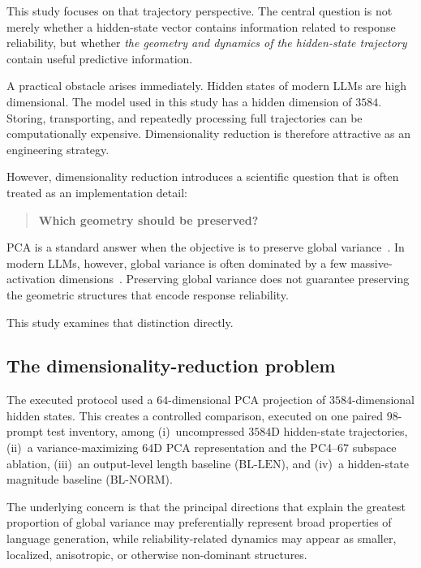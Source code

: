 \documentclass{article}
\newcommand{\bllen}{\mathrm{BL\text{-}LEN}}
\newcommand{\blnorm}{\mathrm{BL\text{-}NORM}}
\begin{document}
This study focuses on that trajectory perspective. The central question is not merely whether a hidden-state vector contains information related to response reliability, but whether \emph{the geometry and dynamics of the hidden-state trajectory} contain useful predictive information.

A practical obstacle arises immediately. Hidden states of modern {LLMs} are high dimensional. The model used in this study has a hidden dimension of $3584$. Storing, transporting, and repeatedly processing full trajectories can be computationally expensive. Dimensionality reduction is therefore attractive as an engineering strategy.

However, dimensionality reduction introduces a scientific question that is often treated as an implementation detail:

\begin{quote}
\centering\textbf{Which geometry should be preserved?}
\end{quote}

{PCA} is a standard answer when the objective is to preserve global variance~\citep{pearson1901,jolliffe2002,chvatal1983linear}. In modern {LLMs}, however, global variance is often dominated by a few massive-activation dimensions~\citep{sun2024massive}. Preserving global variance does not guarantee preserving the geometric structures that encode response reliability.

This study examines that distinction directly.

\subsection{The dimensionality-reduction problem}
\label{sec:intro-dr}

The executed protocol used a $64$-dimensional {PCA} projection of $3584$-dimensional hidden states. This creates a controlled comparison, executed on one paired $98$-prompt test inventory, among
(i)~uncompressed $3584${D} hidden-state trajectories,
(ii)~a variance-maximizing $64${D} {PCA} representation and the {PC4}--{67} subspace ablation,
(iii)~an output-level length baseline ($\bllen$), and
(iv)~a hidden-state magnitude baseline ($\blnorm$).

The underlying concern is that the principal directions that explain the greatest proportion of global variance may preferentially represent broad properties of language generation, while reliability-related dynamics may appear as smaller, localized, anisotropic, or otherwise non-dominant structures.
\end{document}
